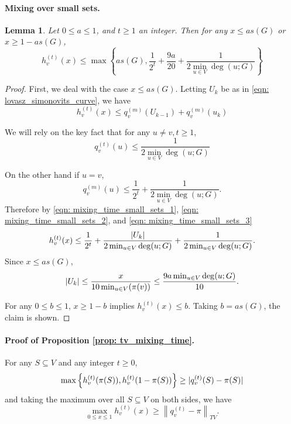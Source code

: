 \documentclass{article}
\DeclarePairedDelimiter\abs{\lvert}{\rvert}
\newcommand{\set}[1]{\left\{#1\right\}}
\newcommand{\norm}[1]{\left\lVert#1\right\rVert}
\newcommand{\1}{\mathbf{1}}
\theoremstyle{aldenthm}
\newtheorem{lemma}{Lemma}
\theoremstyle{aldenrmrk}
\begin{document}
\paragraph{Mixing over small sets.}

\begin{lemma}
	\label{lem: mixing_time_small_sets}
	Let $0 \leq a \leq 1$, and $t \geq 1$ an integer. Then for any $x \leq as(G)$ or $x \geq 1 - as(G)$,
	\begin{equation*}
	h_v^{(t)}(x) \leq \max\set{as(G), \frac{1}{2^t} + \frac{9a}{20} + \frac{1}{2 \min_{u \in V}\deg(u;G)} }
	\end{equation*}
\end{lemma}
\begin{proof}
	First, we deal with the case $x \leq as(G)$. Letting $U_k$ be as in \eqref{eqn: lovasz_simonovits_curve}, we have
	\begin{equation}
	\label{eqn: mixing_time_small_sets_1}
	h_v^{(t)}(x) \leq q_v^{(m)}(U_{k - 1}) + q_v^{(m)}(u_k)
	\end{equation}
	
	We will rely on the key fact that for any $u \neq v, t \geq 1$,
	\begin{equation}
	\label{eqn: mixing_time_small_sets_2}
	q_v^{(t)}(u) \leq \frac{1}{2 \min_{u \in V}\deg(u;G)}
	\end{equation}
	
	On the other hand if $u = v$,
	\begin{equation}
	\label{eqn: mixing_time_small_sets_3}
	q_v^{(m)}(u) \leq \frac{1}{2^t} + \frac{1}{2\min_{u \in V}\deg(u;G)}.
	\end{equation}
	Therefore by \eqref{eqn: mixing_time_small_sets_1}, \eqref{eqn: mixing_time_small_sets_2}, and \eqref{eqn: mixing_time_small_sets_3}
	\begin{equation*}
	h_v^{(t)}(x) \leq \frac{1}{2^t} + \frac{\abs{U_k}}{2 \min_{u \in V}\deg(u;G)} + \frac{1}{2 \min_{u \in V}\deg(u;G)}.
	\end{equation*}
	Since $x \leq a s(G)$, 
	\begin{equation*}
	\abs{U_k} \leq \frac{x}{10 \min_{u \in V}(\pi(v))} \leq \frac{9a\min_{u \in V}\deg(u;G)}{10}.
	\end{equation*}
	
	For any $0 \leq b \leq 1$, $x \geq 1 - b$ implies $h_v^{(t)}(x) \leq b$. Taking $b = a s(G)$, the claim is shown.
\end{proof}

\paragraph{Proof of Proposition \ref{prop: tv_mixing_time}.}
For any $S \subseteq V$ and any integer $t \geq 0$,
\begin{equation*}
\max \set{h_v^{(t)}(\pi(S)), h_v^{(t)}(1 - \pi(S))} \geq \abs{q_v^{(t)}(S) - \pi(S)}
\end{equation*}
and taking the maximum over all $S \subseteq V$ on both sides, we have
\begin{equation*}
\max_{0 \leq x \leq 1} h_v^{(t)}(x) \geq \norm{q_v^{(t)} - \pi}_{TV}.
\end{equation*}
\end{document}

